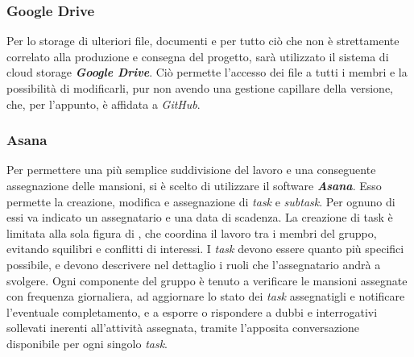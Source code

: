 		\subsubsection{Google Drive}
		Per lo storage di ulteriori file, documenti e per tutto ciò che non è strettamente correlato alla produzione e consegna del progetto, sarà utilizzato il sistema di cloud storage \textbf{\textit{Google Drive}}. Ciò permette l'accesso dei file a tutti i membri e la possibilità di modificarli, pur non avendo una gestione capillare della versione, che, per l'appunto, è affidata a \textit{GitHub}.

		\subsubsection{Asana}
		Per permettere una più semplice suddivisione del lavoro e una conseguente assegnazione delle mansioni, si è scelto di utilizzare il software \textbf{\textit{Asana}}. Esso permette la creazione, modifica e assegnazione di \textit{task} e \textit{subtask}. Per ognuno di essi va indicato un assegnatario e una data di scadenza. La creazione di task è limitata alla sola figura di \textit{\RdP}, che coordina il lavoro tra i membri del gruppo, evitando squilibri e conflitti di interessi. I \textit{task} devono essere quanto più specifici possibile, e devono descrivere nel dettaglio i ruoli che l'assegnatario andrà a svolgere. Ogni componente del gruppo è tenuto a verificare le mansioni assegnate con frequenza giornaliera, ad aggiornare lo stato dei \textit{task} assegnatigli e notificare l'eventuale completamento, e a esporre o rispondere a dubbi e interrogativi sollevati inerenti all'attività assegnata, tramite l'apposita conversazione disponibile per ogni singolo \textit{task}.